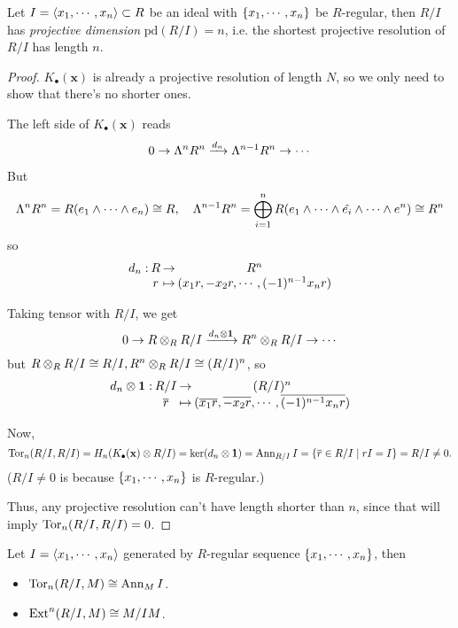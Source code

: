 \begin{coro}
  Let $I = \langle x_1, \cdots, x_n\rangle \subset R$ be an ideal with $\lbrace x_1, \cdots, x_n\rbrace$ be $R$-regular, 
  then $R/I$ has {\it projective dimension} $\mathrm{pd}(R/I) = n$, 
  i.e. the shortest projective resolution of $R/I$ has length $n$.

  \begin{proof}
    $K_\bullet(\mathbf{x})$ is already a projective resolution of length $N$, so 
    we only need to show that there's no shorter ones.

    The left side of $K_\bullet(\mathbf{x})$ reads
    $$
    0 \to \Lambda^n R^n \xrightarrow{d_n} \Lambda^{n-1} R^n \to \cdots
    $$

    But 
    $$
    \Lambda^n R^n = R(e_1 \wedge \cdots \wedge e_n) \cong R, \quad
    \Lambda^{n-1} R^n = \bigoplus\limits_{i=1}^n  R (e_1 \wedge \cdots \wedge \hat{e_i} \wedge \cdots \wedge e^n)
    \cong R^n
    $$
    so
    $$
    \deffunc{d_n}{R}{R^n}{r}{(x_1 r, -x_2 r, \cdots, (-1)^{n-1} x_n r)}
    $$

    Taking tensor with $R/I$, we get
    $$
    0 \to R \otimes_R R/I \xrightarrow{d_n \otimes \mathbf{1}} R^n \otimes_R R/I \to \cdots
    $$
    but $R \otimes_R R/I \cong R/I, R^n \otimes_R R/I \cong (R/I)^n$, so
    $$
    \deffunc{d_n \Ot \id}{R/I}{(R/I)^n}{\ob{r}}{(\ob{x_1r}, \ob{-x_2r}, \cdots, \ob{(-1)^{n-1}x_n r})}
    $$

    Now, 
    $$
    \operatorname{Tor}_n(R/I, R/I) = H_n(K_\bullet(\mathbf{x}) \otimes R/I) = \ker (d_n \otimes \mathbf{1})
    = \operatorname{Ann}_{R/I} I = \lbrace\overline{r} \in R/I \mid rI = I\rbrace = R/I \neq 0.
    $$
    ($R/I \neq 0$ is because $\lbrace x_1, \cdots, x_n\rbrace$ is $R$-regular.)
    
    Thus, any projective resolution can't have length
    shorter than $n$, since that will imply $\operatorname{Tor}_n(R/I, R/I) = 0$.
  \end{proof}
\end{coro}

\begin{remark}
  Let $I = \langle x_1, \cdots, x_n\rangle$ generated by $R$-regular sequence 
  $\lbrace x_1, \cdots, x_n\rbrace$, then
  \begin{itemize}
    \item $\operatorname{Tor}_n(R/I, M) \cong \operatorname{Ann}_M I$.
    \item $\operatorname{Ext}^n(R/I, M) \cong M/IM$.
  \end{itemize}
\end{remark}

